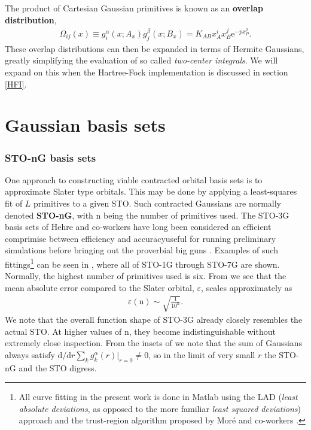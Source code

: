 \documentclass[../../master.tex]{subfiles}
\begin{document}
The product of Cartesian Gaussian primitives is known as an {\bf overlap distribution}, \cite{integrals}
\begin{align}
\Omega_{ij}(x)\equiv g_i^\alpha(x;A_x)g_j^\beta(x;B_x)= K_{AB}x_A^ix_B^j \mathrm{e}^{-px_P^2}.
\end{align}
These overlap distributions can then be expanded in terms of Hermite Gaussians, greatly simplifying the evaluation of so called \emph{two-center integrals}. We will expand on this when the Hartree-Fock implementation is discussed in section \ref{HFI}.

\section{Gaussian basis sets}
\subsubsection{STO-nG basis sets}
One approach to constructing viable contracted orbital basis sets is to approximate Slater type orbitals. This may be done by applying a least-squares fit of $L$ primitives to a given STO. Such contracted Gaussians are normally denoted {\bf STO-nG}, with n being the number of primitives used. The STO-3G basis sets of Hehre and co-workers have long been considered an efficient comprimise between efficiency and accuracy\textemdash useful for running preliminary simulations before bringing out the proverbial big guns \cite{hehre,cramer,taylor}. Examples of such fittings\footnote{All curve fitting in the present work is done in {\sc Matlab} using the LAD (\emph{least absolute deviations}, as opposed to the more familiar \emph{least squared deviations}) approach and the trust-region algorithm proposed by Moré and co-workers \cite{charnes1955optimal,koenker1978regression,more1983computing}.} can be seen in , where all of STO-1G through STO-7G are shown. Normally, the highest number of primitives used is six. From  we see that the mean absolute error compared to the Slater orbital, $\varepsilon$, scales approximately as 
\begin{align}
\varepsilon(\text{n})\sim \sqrt{\frac{1}{10^\text{n}}}.
\end{align}
We note that the overall function shape of STO-3G already closely resembles the actual STO. At higher values of n, they become indistinguishable without extremely close inspection. From the insets of  we note that the sum of Gaussians always satisfy $\mathrm{d}/\mathrm{d}r \sum_k g_k^\alpha(r)\big|_{r=0}\not=0$, so in the limit of very small $r$ the STO-nG and the STO digress. 
\end{document}
